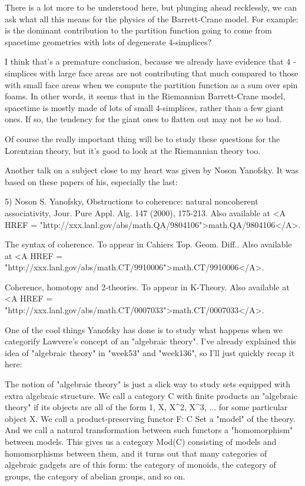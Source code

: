 There is a lot more to be understood here, but plunging ahead recklessly, we 
can ask what all this means for the physics of the Barrett-Crane model.  For 
example: is the dominant contribution to the partition function going to come 
from spacetime geometries with lots of degenerate 4-simplices?

I think that's a premature conclusion, because we already have evidence that 4
-simplices with large face areas are not contributing that much compared to 
those with small face areas when we compute the partition function as a sum 
over spin foams.  In other words, it seems that in the Riemannian Barrett-Crane
model, spacetime is mostly made of lots of small 4-simplices, rather than a 
few giant ones.   If so, the tendency for the giant ones to flatten out may 
not be so bad. 

Of course the really important thing will be to study these questions for 
the Lorentzian theory, but it's good to look at the Riemannian theory too.

Another talk on a subject close to my heart was given by Noson Yanofsky.   
It was based on these papers of his, especially the last:

5) Noson S. Yanofsky, Obstructions to coherence: natural noncoherent 
associativity, Jour. Pure Appl.  Alg. 147 (2000), 175-213.  Also 
available at 
<A HREF = "http://xxx.lanl.gov/abs/math.QA/9804106">math.QA/9804106</A>.

The syntax of coherence.  To appear in Cahiers Top. Geom. Diff..
Also available at 
<A HREF = "http://xxx.lanl.gov/abs/math.CT/9910006">math.CT/9910006</A>.

Coherence, homotopy and 2-theories.  To appear in K-Theory.
Also available at 
<A HREF = "http://xxx.lanl.gov/abs/math.CT/0007033">math.CT/0007033</A>.

One of the cool things Yanofsky has done is to study what happens when 
we categorify Lawvere's concept of an "algebraic theory".  I've already 
explained this idea of "algebraic theory" in "week53" and "week136", so 
I'll just quickly recap it here:
 
The notion of "algebraic theory" is just a slick way to study sets
equipped with extra algebraic structure.  We call a category C with
finite products an "algebraic theory" if its objects are all of the
form 1, X, X^{2}, X^{3}, ...  for some particular
object X.  We call a product-preserving functor F: C \to  Set a "model"
of the theory.  And we call a natural transformation between such
functors a "homomorphism" between models.  This gives us a category
Mod(C) consisting of models and homomorphisms between them, and it
turns out that many categories of algebraic gadgets are of this form:
the category of monoids, the category of groups, the category of
abelian groups, and so on.


